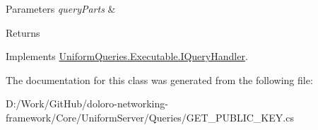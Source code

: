 \begin{DoxyParams}{Parameters}
{\em query\+Parts} & \\
\hline
\end{DoxyParams}
\begin{DoxyReturn}{Returns}

\end{DoxyReturn}


Implements \mbox{\hyperlink{interface_uniform_queries_1_1_executable_1_1_i_query_handler_a0f43184bf3e306a7cbebc39098f044ee}{Uniform\+Queries.\+Executable.\+I\+Query\+Handler}}.



The documentation for this class was generated from the following file\+:\begin{DoxyCompactItemize}
\item 
D\+:/\+Work/\+Git\+Hub/doloro-\/networking-\/framework/\+Core/\+Uniform\+Server/\+Queries/G\+E\+T\+\_\+\+P\+U\+B\+L\+I\+C\+\_\+\+K\+E\+Y.\+cs\end{DoxyCompactItemize}
